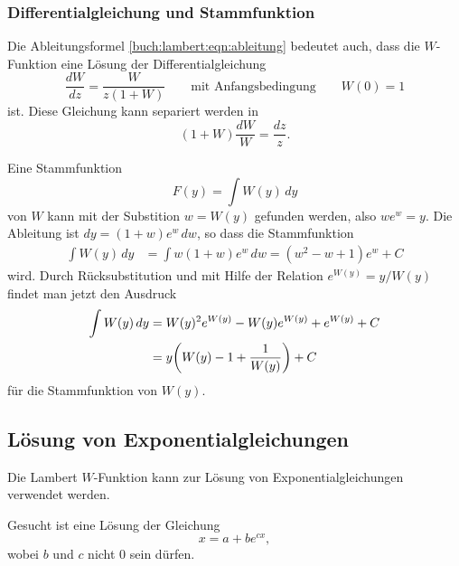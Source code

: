 %
%
\subsubsection{Differentialgleichung und Stammfunktion}
%
%
Die Ableitungsformel \eqref{buch:lambert:eqn:ableitung} bedeutet auch,
dass die $W$-Funktion eine Lösung der Differentialgleichung
\[
\frac{dW}{dz}
=
\frac{W}{z(1+W)}
\qquad
\text{mit Anfangsbedingung}
\qquad
W(0) = 1
\]
ist.
Diese Gleichung kann separiert werden in
\[
(1+W)\frac{dW}{W} = \frac{dz}{z}.
\]

Eine Stammfunktion
%
\[
F(y)
=
\int W(y)\,dy
\]
von $W$ kann mit der Substition $w=W(y)$ gefunden
werden, also $we^w=y$.
Die Ableitung ist $dy = (1+w)e^w\,dw$, so dass die Stammfunktion
\begin{align*}
\int W(y)\,dy
&=
\int w (1+w)e^w\,dw
=
(w^2-w+1)e^w+C
\end{align*}
wird.
Durch Rücksubstitution und mit Hilfe der Relation $e^{W(y)} = y/W(y)$
findet man jetzt den Ausdruck
\begin{align}
\int W(y)\,dy
&=
W(y)^2 e^{W(y)} - W(y)e^{W(y)} + e^{W(y)} + C
\notag
\\
&=
y\biggl(W(y) - 1 + \frac{1}{W(y)}\biggr) + C
\label{buch:lambert:eqn:stammfunktion}
\end{align}
für die Stammfunktion von $W(y)$.

%
%
\subsection{Lösung von Exponentialgleichungen
\label{buch:subsection:loesung-von-exponentialgleichungen}}
Die Lambert $W$-Funktion kann zur Lösung von Exponentialgleichungen
verwendet werden.
%
%

\begin{aufgabe}
Gesucht ist eine Lösung der Gleichung
\[
x=a+be^{cx},
\]
wobei $b$ und $c$ nicht $0$ sein dürfen.
\end{aufgabe}

